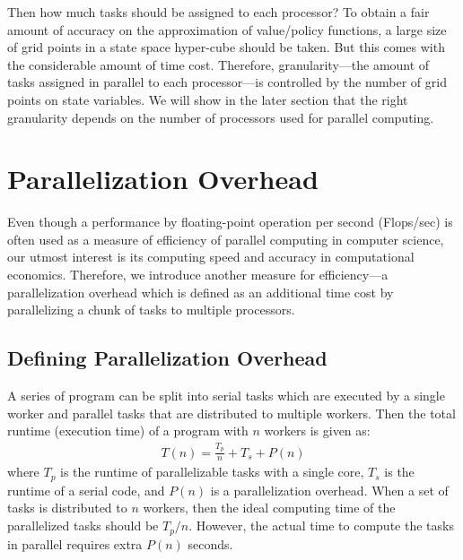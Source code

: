 \documentclass[12pt]{article}
\begin{document}
Then how much tasks should be assigned to each processor? To obtain a fair amount of accuracy on the approximation of value/policy functions, a large size of grid points in a state space hyper-cube should be taken. But this comes with the considerable amount of time cost. Therefore, granularity---the amount of tasks assigned in parallel to each processor---is controlled by the number of grid points on state variables. We will show in the later section that the right granularity depends on the number of processors used for parallel computing.






\clearpage
\section{Parallelization Overhead}
Even though a performance by floating-point operation per second (Flops/sec) is often used as a measure of efficiency of parallel computing in computer science, our utmost interest is its computing speed and accuracy in computational economics. Therefore, we introduce another measure for efficiency---a parallelization overhead which is defined as an additional time cost by parallelizing a chunk of tasks to multiple processors. 


\subsection{Defining Parallelization Overhead}
A series of program can be split into serial tasks which are executed by a single worker and parallel tasks that are distributed to multiple workers. Then the total runtime (execution time) of a program with $n$ workers is given as:
\begin{align*}
T(n) = \frac{T_p}{n} + T_s + P(n)
\end{align*}
where $T_p$ is the runtime of parallelizable tasks with a single core, $T_s$ is the runtime of a serial code, and $P(n)$ is a parallelization overhead. When a set of tasks is distributed to $n$ workers, then the ideal computing time of the parallelized tasks should be $T_p/n$. However, the actual time to compute the tasks in parallel requires extra $P(n)$ seconds.
\end{document}
